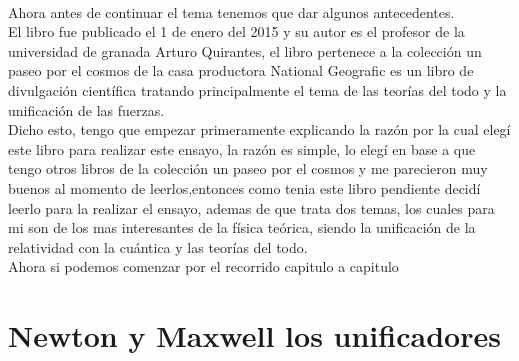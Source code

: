 \documentclass[12pt]{article}
\begin{document}
\paragraph*{}
\textsf{Ahora antes de continuar el tema tenemos que dar algunos antecedentes.\\ El libro fue publicado el 1 de enero del 2015
y su autor es el profesor de la universidad de granada Arturo Quirantes, el libro pertenece a la colección
un paseo por el cosmos de la casa productora National Geografic es un libro de divulgación científica tratando principalmente
el tema de las teorías del todo y la unificación de las fuerzas.\\
Dicho esto, tengo que empezar primeramente explicando la razón por la cual elegí este libro para realizar este ensayo, la razón es simple,
lo elegí en base a que tengo otros libros de la colección un paseo por el cosmos y me parecieron muy buenos al momento de leerlos,entonces
como tenia este libro pendiente decidí leerlo para la realizar el ensayo, ademas de que trata dos temas, los cuales para mi son de los mas interesantes
de la física teórica, siendo la unificación de la relatividad con la cuántica y las teorías del todo.\\
Ahora si podemos comenzar por el recorrido capitulo a capitulo}
\section*{Newton y Maxwell los unificadores}
\paragraph*{}
\end{document}
